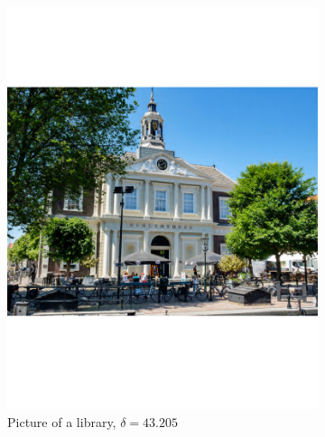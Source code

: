 \documentclass[a4paper]{article}
\begin{document}
\begin{figure}[H]
\begin{subfigure}{0.49\textwidth}
	\includegraphics[trim={4cm 8cm 4cm 8cm},clip,width=1\textwidth]{Images/BibMid.pdf}
	\caption{Picture of a library, $\delta = 43.205$}
	\label{sub:BibMid}
\end{subfigure}
	\begin{subfigure}{0.49\textwidth}
	\centering

\end{subfigure}
\end{figure}
\end{document}
